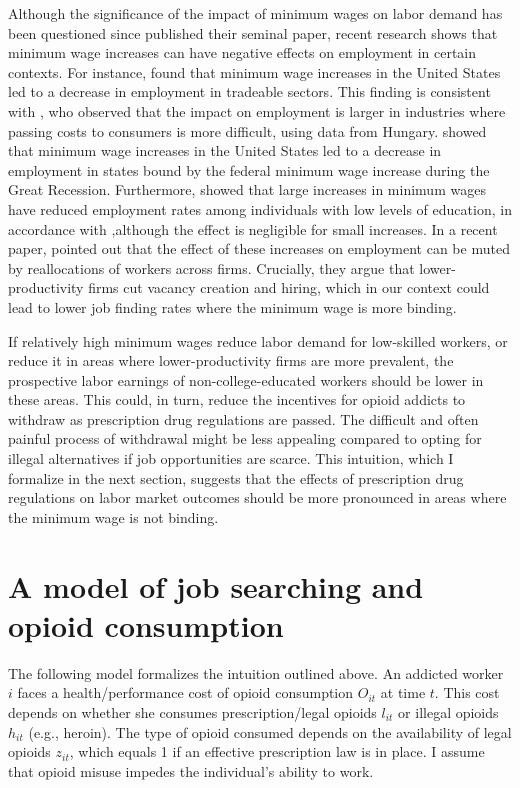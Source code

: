 \documentclass[12pt,a4paper]{article}
\begin{document}
Although the significance of the impact of minimum wages on labor demand has been questioned since \textcite{Card1994} published their seminal paper, recent research shows that minimum wage increases can have negative effects on employment in certain contexts.
For instance, \textcite{Cengiz2019} found that minimum wage increases in the United States led to a decrease in employment in tradeable sectors.
This finding is consistent with \textcite{Harasztosi2019}, who observed that the impact on employment is larger in industries where passing costs to consumers is more difficult, using data from Hungary.
\textcite{Clemens2019} showed that minimum wage increases in the United States led to a decrease in employment in states bound by the federal minimum wage increase during the Great Recession.
Furthermore, \textcite{Clemens2021} showed that large increases in minimum wages have reduced employment rates among individuals with low levels of education, in accordance with \textcite{Neumark2004},although the effect is negligible for small increases.
In a recent paper, \textcite{Engbom2022} pointed out that the effect of these increases on employment can be muted by reallocations of workers across firms.
Crucially, they argue that lower-productivity firms cut vacancy creation and hiring, which in our context could lead to lower job finding rates where the minimum wage is more binding.

If relatively high minimum wages reduce labor demand for low-skilled workers, or reduce it in areas where lower-productivity firms are more prevalent, the prospective labor earnings of non-college-educated workers should be lower in these areas.
This could, in turn, reduce the incentives for opioid addicts to withdraw as prescription drug regulations are passed. 
The difficult and often painful process of withdrawal might be less appealing compared to opting for illegal alternatives if job opportunities are scarce.
This intuition, which I formalize in the next section, suggests that the effects of prescription drug regulations on labor market outcomes should be more pronounced in areas where the minimum wage is not binding.

\section*{A model of job searching and opioid consumption}

The following model formalizes the intuition outlined above. 
An addicted worker \(i\) faces a health/performance cost of opioid consumption \(O_{it}\) at time \(t\).
This cost depends on whether she consumes prescription/legal opioids \(l_{it}\) or illegal opioids \(h_{it}\) (e.g., heroin).
The type of opioid consumed depends on the availability of legal opioids \(z_{it}\), which equals 1 if an effective prescription law is in place.
I assume that opioid misuse impedes the individual's ability to work.
\end{document}
